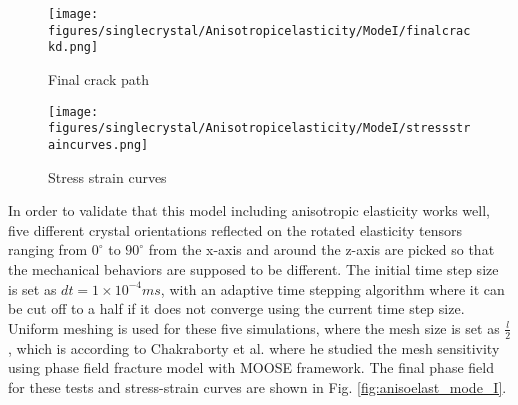 \documentclass[3p,10pt,sort&compress]{elsarticle}
\begin{document}
\begin{figure*}[!htb]
	\centering
  \begin{subfigure}{0.45\textwidth}
		\texttt{[image: figures/singlecrystal/Anisotropicelasticity/ModeI/finalcrackd.png]}
		\caption{Final crack path}
	  \label{fig:ModeIcrack}
	\end{subfigure}
	\begin{subfigure}{0.45\textwidth}
		\texttt{[image: figures/singlecrystal/Anisotropicelasticity/ModeI/stressstraincurves.png]}
		\caption{Stress strain curves}
	  \label{fig:tensionstresscurves}
	\end{subfigure}
	\caption{Crack propagation in a Mode I fracture simulation using isotropic material with l = 0.01 mm.
  The final crack paths for the five rotated crystal orientations are the same as shown in \ref{fig:ModeIcrack}.
  The resultant stress-strain curves of these five test sets are shown in \ref{fig:tensionstresscurves} }
  \label{fig:anisoelast_mode_I}
\end{figure*}
In order to validate that this model including anisotropic elasticity works well, five different crystal orientations reflected on the rotated elasticity tensors ranging from $0^{\circ}$ to $90^{\circ}$ from the x-axis and around the z-axis are picked so that the mechanical behaviors are supposed to be different. The initial time step size is set as $dt=1\times 10^{-4} ms$, with an adaptive time stepping algorithm where it can be cut off to a half if it does not converge using the current time step size. Uniform meshing is used for these five simulations, where the mesh size is set as $\frac{l}{2}$, which is according to Chakraborty et al. \cite{chakraborty2016multi} where he studied the mesh sensitivity using phase field fracture model with MOOSE framework. The final phase field for these tests and stress-strain curves are shown in Fig. \ref{fig:anisoelast_mode_I}.
\end{document}
